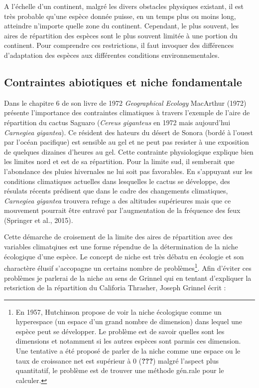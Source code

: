 A l'échelle d'un continent, malgré les divers obstacles physiques
existant, il est très probable qu'une espèce donnée puisse, en un temps
plus ou moins long, atteindre n'importe quelle zone du continent.
Cependant, le plus souvent, les aires de répartition des espèces sont le
plus souvent limitée à une portion du continent. Pour comprendre ces
restrictions, il faut invoquer des différences d'adaptation des espèces
aux différentes conditions environnementales.

\subsection*{Contraintes abiotiques et niche
fondamentale}\label{contraintes-abiotiques-et-niche-fondamentale}

Dans le chapitre 6 de son livre de 1972 \emph{Geographical Ecology}
MacArthur (1972) présente l'importance des contraintes climatiques à
travers l'exemple de l'aire de répartition du cactus Saguaro
(\emph{Cereus giganteus} en 1972 mais aujourd'hui \emph{Carnegiea
gigantea}). Ce résident des hateurs du désert de Sonora (bordé à l'ouest
par l'océan pacifique) est sensible au gel et ne peut pas resister à une
exposition de quelques dizaines d'heures au gel. Cette contrainte
physiologique explique bien les limites nord et est de sa répartition.
Pour la limite sud, il semberait que l'abondance des pluies hivernales
ne lui soit pas favorables. En s'appuyant sur les conditions climatiques
actuelles dans lesquelles le cactus se développe, des résulats récents
prédisent que dans le cadre des changements climatiques, \emph{Carnegiea
gigantea} trouvera refuge a des altitudes supérieures mais que ce
mouvement pourrait être entravé par l'augmentation de la fréquence des
feux (Springer et al., 2015).

Cette démarche de croisement de la limite des aires de répartition avec
des variables climatqiues est une forme répendue de la détermination de
la niche écologique d'une espèce. Le concept de niche est très débatu en
écologie et son charactère élusif s'accopagne un certains nombre de
problèmes\footnote{En 1957, Hutchinson propose de voir la niche
  écologique comme un hyperespace (un espace d'un grand nombre de
  dimension) dans lequel une espèce peut se développer. Le problème est
  de savoir quelles sont les dimensions et notamment si les autres
  espèces sont parmis ces dimension. Une tentative a été proposé de
  parler de la niche comme une espace ou le taux de croissance net est
  supérieur à 0 ({\textbf{???}}) malgré l'aspect plus quantitatif, le
  problème est de trouver une méthode gén.rale pour le calculer.}. Afin
d'éviter ces problèmes je parlerai de la niche au sens de Grinnel qui en
tentant d'expliquer la retsriction de la répartition du Califoria
Thrasher, Joseph Grinnel écrit :

